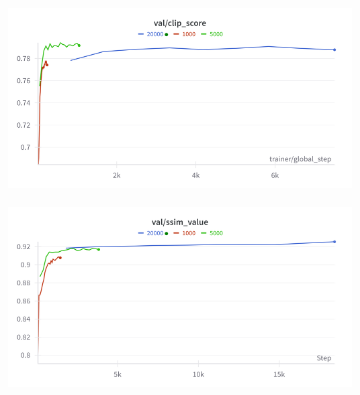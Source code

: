 \begin{figure}[htbp]
  \centering
  \begin{subfigure}[b]{0.48\textwidth}
    \centering
    \includegraphics[width=\textwidth]{images/experiments/data_scale/clip_score.png}
    \label{fig:exp_data_scale_clip}
  \end{subfigure}
  \hfill
  \begin{subfigure}[b]{0.48\textwidth}
    \centering
    \includegraphics[width=\textwidth]{images/experiments/data_scale/ssim.png}
    \label{fig:exp_data_scale_ssim}
  \end{subfigure}


\end{figure}
